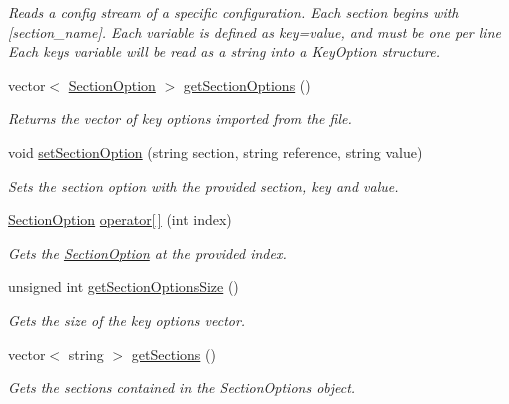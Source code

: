 \begin{DoxyCompactItemize}
\begin{DoxyCompactList}\small\item\em Reads a config stream of a specific configuration. Each section begins with \textquotesingle{}\mbox{[}section\+\_\+name\mbox{]}\textquotesingle{}. Each variable is defined as \textquotesingle{}key=value\textquotesingle{}, and must be one per line Each key\textquotesingle{}s variable will be read as a string into a Key\+Option structure. \end{DoxyCompactList}\item 
vector$<$ \hyperlink{struct_section_option}{Section\+Option} $>$ \hyperlink{class_config_option_a7d9570023d8c96962f90784283b68859}{get\+Section\+Options} ()
\begin{DoxyCompactList}\small\item\em Returns the vector of key options imported from the file. \end{DoxyCompactList}\item 
void \hyperlink{class_config_option_ac824f16f50a77fcc5c11d5ac3fb244cc}{set\+Section\+Option} (string section, string reference, string value)
\begin{DoxyCompactList}\small\item\em Sets the section option with the provided section, key and value. \end{DoxyCompactList}\item 
\hyperlink{struct_section_option}{Section\+Option} \hyperlink{class_config_option_a66d2199cf3bd4fa015ef38e34fe02bd1}{operator\mbox{[}$\,$\mbox{]}} (int index)
\begin{DoxyCompactList}\small\item\em Gets the \hyperlink{struct_section_option}{Section\+Option} at the provided index. \end{DoxyCompactList}\item 
unsigned int \hyperlink{class_config_option_acb7b9141efc8d0e50e21ff1adce8e9cb}{get\+Section\+Options\+Size} ()
\begin{DoxyCompactList}\small\item\em Gets the size of the key options vector. \end{DoxyCompactList}\item 
vector$<$ string $>$ \hyperlink{class_config_option_a025402f31cd098e827dee09d08736398}{get\+Sections} ()
\begin{DoxyCompactList}\small\item\em Gets the sections contained in the Section\+Options object. \end{DoxyCompactList}\item 

\end{DoxyCompactItemize}
